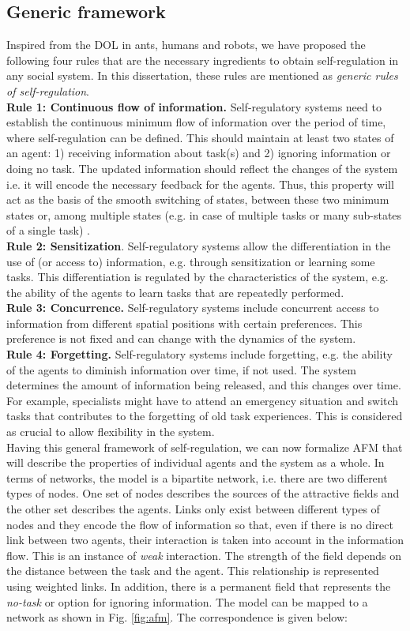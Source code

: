 \subsection{Generic framework}
Inspired from the DOL in ants, humans and robots,  we  have proposed the following four rules that are the necessary ingredients to obtain self-regulation in any social system. In this dissertation, these rules are mentioned as {\em generic rules of self-regulation}. \\
\textbf{Rule 1: Continuous flow of information.} Self-regulatory systems need to establish the continuous minimum flow of information over the period of time, where self-regulation can be defined. This should maintain at least two states of an agent: 1) receiving information about task(s) and 2) ignoring information or doing no task. The updated information should reflect  the changes of the system i.e. it will encode the necessary feedback for the agents. Thus, this property will act as the basis of the smooth switching of states, between these two minimum states or, among multiple states (e.g. in case of multiple tasks or many sub-states of a single task) .\\
\textbf{Rule 2: Sensitization}. Self-regulatory systems allow the differentiation in the use of  (or access to) information, e.g. through sensitization or learning some tasks. This differentiation is regulated by the characteristics of the system, e.g. the ability of the agents to learn tasks that are repeatedly performed.\\
\textbf{Rule 3: Concurrence.} Self-regulatory systems include concurrent access to information from different spatial positions with certain preferences. This preference is not fixed and can change with the dynamics of the system. \\
\textbf{Rule 4: Forgetting.} Self-regulatory systems include forgetting, e.g. the ability of the agents to diminish information over time, if not used. The system determines the amount of information being released, and this changes over time. For example, specialists might have to attend an emergency situation and switch tasks that contributes to the forgetting of old task experiences. This is considered as crucial to allow flexibility in the system.\\
Having this general framework of self-regulation, we can now formalize AFM that will describe the properties of individual  agents and the system as a whole. In terms of networks, the model is a bipartite network, i.e. there are two different types of nodes. One set of nodes describes the sources of the attractive fields and the other set describes the agents. Links only exist between different types of nodes and they encode the flow of information so that, even if there is no direct link between two agents, their interaction is taken into account in the information flow. This is an instance of {\em weak} interaction. The strength of the field depends on the distance between the task and the agent. This relationship is represented using weighted links. In addition, there is a permanent field that represents the {\em no-task} or  option for ignoring information. The model can be mapped to a network as shown in Fig. \ref{fig:afm}. The correspondence is given below:
